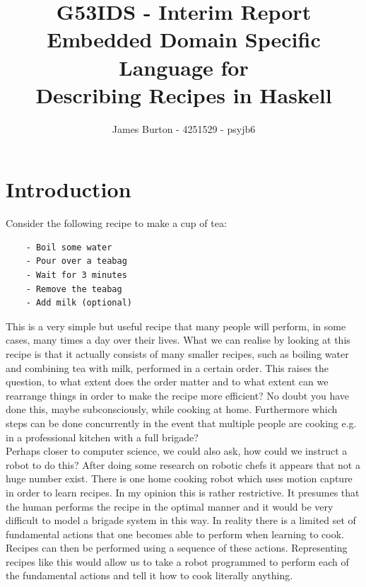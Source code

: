 \documentclass[11pt]{article}
\title
{ 
    G53IDS - Interim Report \\
    \hfill \break
    \large Embedded Domain Specific Language for \\
    Describing Recipes in Haskell
}
\author{James Burton - 4251529 - psyjb6}
\begin{document}
    \maketitle
    \newpage

    \tableofcontents
    \newpage

    \section{Introduction}
    Consider the following recipe to make a cup of tea:

    \begin{tt}
    \small
    \begin{lstlisting}
    - Boil some water
    - Pour over a teabag
    - Wait for 3 minutes
    - Remove the teabag
    - Add milk (optional)
    \end{lstlisting}
    \end{tt}

    This is a very simple but useful recipe that many people
    will perform, in some cases, many times a day over their lives.
    What we can realise by looking at this recipe is that it actually
    consists of many smaller recipes, such as boiling water and
    combining tea with milk, performed in a certain order. This
    raises the question, to what extent does the order matter and
    to what extent can we rearrange things in order to make the recipe
    more efficient? No doubt you have done this, maybe subconsciously,
    while cooking at home. Furthermore which steps can be done
    concurrently in the event that multiple people are cooking e.g.
    in a professional kitchen with a full brigade? \\

    Perhaps closer to computer science, we could also ask, how could
    we instruct a robot to do this? After doing some research on
    robotic chefs it appears that not a huge number exist.
    There is one home cooking robot \cite{robot} which uses motion
    capture in order to learn recipes. In my opinion this is rather
    restrictive. It presumes that the human performs the recipe in
    the optimal manner and it would be very difficult to model
    a brigade system in this way. In reality there is a limited set
    of fundamental actions that one becomes able to perform when
    learning to cook. Recipes can then be performed using a sequence
    of these actions. Representing recipes like this would allow us
    to take a robot programmed to perform each of the fundamental
    actions and tell it how to cook literally anything. \\
\end{document}
